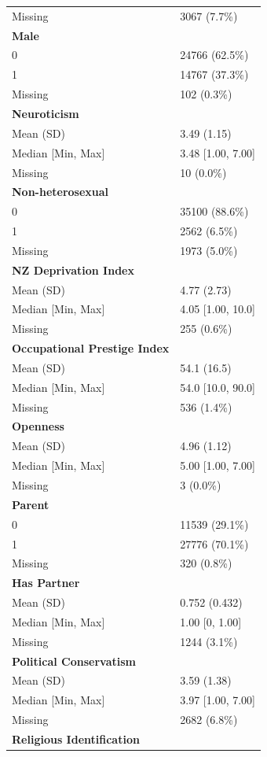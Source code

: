 \documentclass[
  single column]{article}
\begin{document}
\begin{longtable}[]{@{}ll@{}}
Missing & 3067 (7.7\%) \\
\textbf{Male} & \\
0 & 24766 (62.5\%) \\
1 & 14767 (37.3\%) \\
Missing & 102 (0.3\%) \\
\textbf{Neuroticism} & \\
Mean (SD) & 3.49 (1.15) \\
Median {[}Min, Max{]} & 3.48 {[}1.00, 7.00{]} \\
Missing & 10 (0.0\%) \\
\textbf{Non-heterosexual} & \\
0 & 35100 (88.6\%) \\
1 & 2562 (6.5\%) \\
Missing & 1973 (5.0\%) \\
\textbf{NZ Deprivation Index} & \\
Mean (SD) & 4.77 (2.73) \\
Median {[}Min, Max{]} & 4.05 {[}1.00, 10.0{]} \\
Missing & 255 (0.6\%) \\
\textbf{Occupational Prestige Index} & \\
Mean (SD) & 54.1 (16.5) \\
Median {[}Min, Max{]} & 54.0 {[}10.0, 90.0{]} \\
Missing & 536 (1.4\%) \\
\textbf{Openness} & \\
Mean (SD) & 4.96 (1.12) \\
Median {[}Min, Max{]} & 5.00 {[}1.00, 7.00{]} \\
Missing & 3 (0.0\%) \\
\textbf{Parent} & \\
0 & 11539 (29.1\%) \\
1 & 27776 (70.1\%) \\
Missing & 320 (0.8\%) \\
\textbf{Has Partner} & \\
Mean (SD) & 0.752 (0.432) \\
Median {[}Min, Max{]} & 1.00 {[}0, 1.00{]} \\
Missing & 1244 (3.1\%) \\
\textbf{Political Conservatism} & \\
Mean (SD) & 3.59 (1.38) \\
Median {[}Min, Max{]} & 3.97 {[}1.00, 7.00{]} \\
Missing & 2682 (6.8\%) \\
\textbf{Religious Identification} & \\

\end{longtable}
\end{document}
